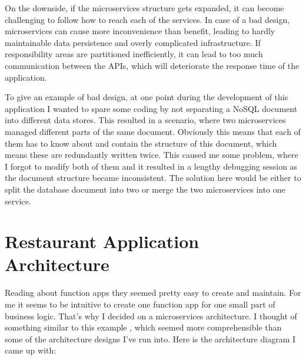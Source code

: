 On the downside, if the microservices structure gets expanded, it can become challenging to follow how to reach each of the services. In case of a bad design, microservices can cause more inconvenience than benefit, leading to hardly maintainable data persistence and overly complicated infrastructure. If responsibility areas are partitioned inefficiently, it can lead to too much communication between the APIs, which will deteriorate the response time of the application.

To give an example of bad design, at one point during the development of this application I wanted to spare some coding by not separating a NoSQL document into different data stores. This resulted in a scenario, where two microservices managed different parts of the same document. Obviously this means that each of them has to know about and contain the structure of this document, which means these are redundantly written twice. This caused me some problem, where I forgot to modify both of them and it resulted in a lengthy debugging session as the document structure became inconsistent. The solution here would be either to split the database document into two or merge the two microservices into one service.

\section{Restaurant Application Architecture}

Reading about function apps they seemed pretty easy to create and maintain. For me it seems to be intuitive to create one function app for one small part of business logic. That's why I decided on a microservices architecture. I thought of something similar to this example \cite{FuncAppsCosmosDB}, which seemed more comprehensible than some of the architecture designs I've run into. Here is the architecture diagram I came up with: 

